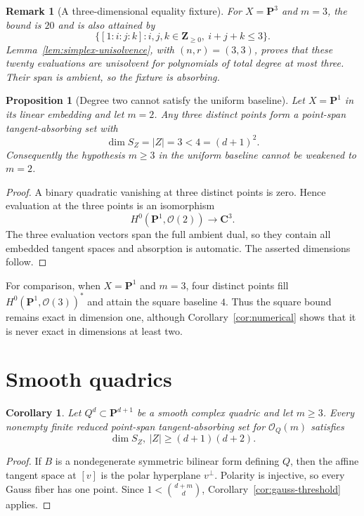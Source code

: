 \documentclass[11pt]{article}
\newtheorem{proposition}[theorem]{Proposition}
\newtheorem{corollary}[theorem]{Corollary}
\newtheorem{remark}[theorem]{Remark}
\newcommand{\PP}{\mathbf P}
\newcommand{\CC}{\mathbf C}
\newcommand{\cO}{\mathcal O}
\begin{document}
\begin{remark}[A three-dimensional equality fixture]\label{rem:p3-fixture}
For $X=\PP^3$ and $m=3$, the bound is $20$ and is also attained by
\[
 \{[1:i:j:k]:i,j,k\in\mathbf Z_{\geq0},\ i+j+k\leq3\}.
\]
Lemma~\ref{lem:simplex-unisolvence}, with $(n,r)=(3,3)$, proves that these
twenty evaluations are unisolvent for polynomials of total degree at most
three.  Their span is ambient, so the fixture is absorbing.
\end{remark}

\begin{proposition}[Degree two cannot satisfy the uniform baseline]
\label{prop:p1-m2}
Let $X=\PP^1$ in its linear embedding and let $m=2$.  Any three distinct
points form a point-span tangent-absorbing set with
\[
 \dim S_Z=|Z|=3<4=(d+1)^2.
\]
Consequently the hypothesis $m\geq3$ in the uniform baseline cannot be
weakened to $m=2$.
\end{proposition}

\begin{proof}
A binary quadratic vanishing at three distinct points is zero.  Hence
evaluation at the three points is an isomorphism
\[
 H^0(\PP^1,\cO(2))\longrightarrow\CC^3.
\]
The three evaluation vectors span the full ambient dual, so they contain all
embedded tangent spaces and absorption is automatic.  The asserted
dimensions follow.
\end{proof}

For comparison, when $X=\PP^1$ and $m=3$, four distinct points fill
$H^0(\PP^1,\cO(3))^*$ and attain the square baseline $4$.  Thus the square
bound remains exact in dimension one, although Corollary~\ref{cor:numerical}
shows that it is never exact in dimensions at least two.

\section{Smooth quadrics}\label{sec:quadrics}

\begin{corollary}\label{cor:quadrics}
Let $Q^d\subset\PP^{d+1}$ be a smooth complex quadric and let $m\geq3$.
Every nonempty finite reduced point-span tangent-absorbing set for
$\cO_Q(m)$ satisfies
\[
 \dim S_Z,\ |Z|\geq(d+1)(d+2).
\]
\end{corollary}

\begin{proof}
If $B$ is a nondegenerate symmetric bilinear form defining $Q$, then the
affine tangent space at $[v]$ is the polar hyperplane $v^\perp$.  Polarity is
injective, so every Gauss fiber has one point.  Since
$1<\binom{d+m}{d}$, Corollary~\ref{cor:gauss-threshold} applies.
\end{proof}
\end{document}
